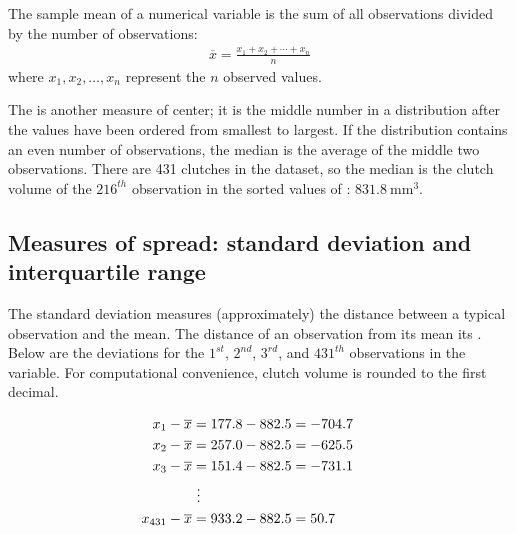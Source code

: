 \begin{termBox}{%
		The sample mean of a numerical variable is the sum of all observations divided by the number of observations:
		\begin{eqnarray}
		\overline{x} = \frac{x_1+x_2+\cdots+x_n}{n}
		\label{meanEquation}
		\end{eqnarray}
		where $x_1, x_2, \dots, x_n$ represent the $n$ observed values.}
\end{termBox}

The  is another measure of center; it is the middle number in a distribution after the values have been ordered from smallest to largest. If the distribution contains an even number of observations, the median is the average of the middle two observations. There are 431 clutches in the dataset, so the median is the clutch volume of the $216^{th}$ observation in the sorted values of : $831.8\ \textrm{mm}^{3}$.

\subsection{Measures of spread: standard deviation and interquartile range}
\label{measuresOfSpread}

The standard deviation measures (approximately) the distance between a typical observation and the mean. The distance of an observation from its mean its . Below are the deviations for the $1^{st}$, $2^{nd}$, $3^{rd}$, and $431^{th}$ observations in the  variable. For computational convenience, clutch volume is rounded to the first decimal.

\begin{align*}
x_1-\overline{x} &= 177.8 - 882.5 = -704.7 \hspace{5mm}\text{ } \\
x_2-\overline{x} &= 257.0 - 882.5 = -625.5 \\
x_3-\overline{x} &= 151.4 - 882.5 = -731.1 \\
&\ \vdots \\
x_{431}-\overline{x} &= 933.2 - 882.5 = 50.7
\end{align*}

